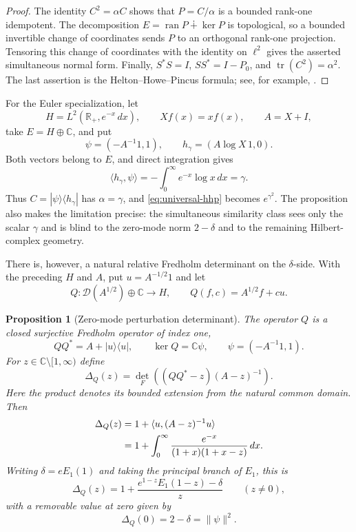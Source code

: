 \documentclass[11pt]{article}
\newtheorem{proposition}[theorem]{Proposition}
\theoremstyle{definition}
\theoremstyle{remark}
\begin{document}
\begin{proof}
The identity $C^2=\alpha C$ shows that $P=C/\alpha$ is a bounded
rank-one idempotent.  The decomposition
$E=\operatorname{ran}P\dotplus\ker P$ is topological, so a bounded
invertible change of coordinates sends $P$ to an orthogonal rank-one
projection.  Tensoring this change of coordinates with the identity on
$\ell^2$ gives the asserted simultaneous normal form.  Finally,
$S^*S=I$, $SS^*=I-P_0$, and
$\operatorname{tr}(C^2)=\alpha^2$.  The last assertion is the
Helton--Howe--Pincus formula; see, for example, \cite{Migler2017}.
\end{proof}

For the Euler specialization, let
\[
 H=L^2(\mathbb R_+,e^{-x}\,dx),\qquad Xf(x)=xf(x),\qquad A=X+I,
\]
take $E=H\oplus\mathbb C$, and put
\[
 \psi=(-A^{-1}1,1),\qquad h_\gamma=(A\log X\,1,0).
\]
Both vectors belong to $E$, and direct integration gives
\[
 \langle h_\gamma,\psi\rangle
 =-\int_0^\infty e^{-x}\log x\,dx=\gamma.
\]
Thus $C=|\psi\rangle\langle h_\gamma|$ has $\alpha=\gamma$, and
\eqref{eq:universal-hhp} becomes $e^{\gamma^2}$.  The proposition also
makes the limitation precise: the simultaneous similarity class sees only
the scalar $\gamma$ and is blind to the zero-mode norm $2-\delta$ and to
the remaining Hilbert-complex geometry.

There is, however, a natural relative Fredholm determinant on the
$\delta$-side.  With the preceding $H$ and $A$, put $u=A^{-1/2}1$ and let
\[
 Q:\mathcal D(A^{1/2})\oplus\mathbb C\longrightarrow H,
 \qquad Q(f,c)=A^{1/2}f+cu.
\]

\begin{proposition}[Zero-mode perturbation determinant]
The operator $Q$ is a closed surjective Fredholm operator of index one,
\[
 QQ^*=A+|u\rangle\langle u|,
 \qquad
 \ker Q=\mathbb C\psi,
 \qquad
 \psi=(-A^{-1}1,1).
\]
For $z\in\mathbb C\setminus[1,\infty)$ define
\[
 \Delta_Q(z)=
 \det_F\!\left((QQ^*-z)(A-z)^{-1}\right).
\]
Here the product denotes its bounded extension from the natural common
domain.
Then
\begin{align}
 \Delta_Q(z)
 &=1+\langle u,(A-z)^{-1}u\rangle \notag\\
 &=1+\int_0^\infty
       \frac{e^{-x}}{(1+x)(1+x-z)}\,dx.\label{eq:relative-determinant}
\end{align}
Writing $\delta=eE_1(1)$ and taking the principal branch of $E_1$, this is
\[
 \Delta_Q(z)=1+
 \frac{e^{1-z}E_1(1-z)-\delta}{z}
 \qquad(z\ne0),
\]
with a removable value at zero given by
\begin{equation}\label{eq:delta-relative-determinant}
 \Delta_Q(0)=2-\delta=\|\psi\|^2.
\end{equation}
\end{proposition}
\end{document}
